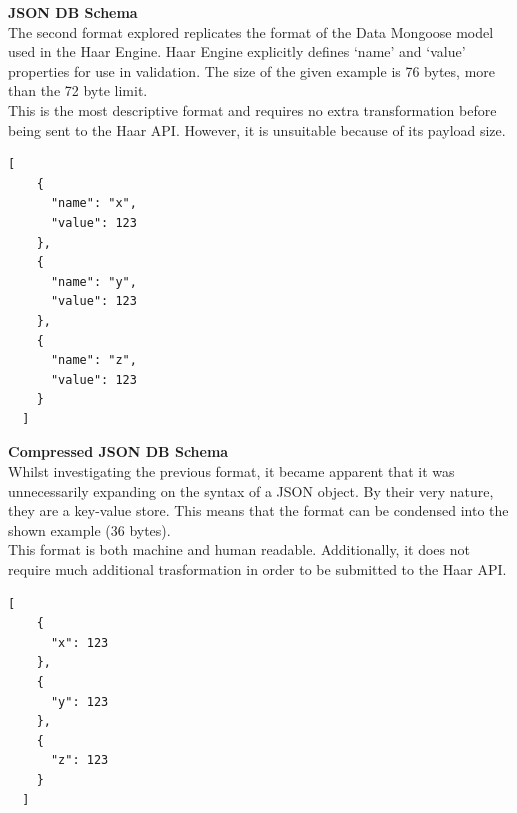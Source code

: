       \noindent
      \begin{minipage}[t]{0.45\textwidth}
        \textbf{JSON DB Schema}\\
        The second format explored replicates the format of the Data Mongoose model used in the Haar Engine. Haar Engine explicitly defines `name' and `value' properties for use in validation. The size of the given example is 76 bytes, more than the 72 byte limit.\\

        This is the most descriptive format and requires no extra transformation before being sent to the Haar API. However, it is unsuitable because of its payload size.
      \end{minipage}
      \hfill
      \begin{minipage}[t]{0.45\textwidth}
        \begin{lstlisting}[frame=single]
  [
    {
      "name": "x",
      "value": 123
    },
    {
      "name": "y",
      "value": 123
    },
    {
      "name": "z",
      "value": 123
    }
  ]
        \end{lstlisting}
      \end{minipage}

      \noindent
      \begin{minipage}[t]{0.45\textwidth}
        \textbf{Compressed JSON DB Schema}\\
        Whilst investigating the previous format, it became apparent that it was unnecessarily expanding on the syntax of a JSON object. By their very nature, they are a key-value store. This means that the format can be condensed into the shown example (36 bytes).\\

        This format is both machine and human readable. Additionally, it does not require much additional trasformation in order to be submitted to the Haar API.\\
      \end{minipage}
      \hfill
      \begin{minipage}[t]{0.45\textwidth}
        \begin{lstlisting}[frame=single]
  [
    {
      "x": 123
    },
    {
      "y": 123
    },
    {
      "z": 123
    }
  ]
        \end{lstlisting}
      \end{minipage}

